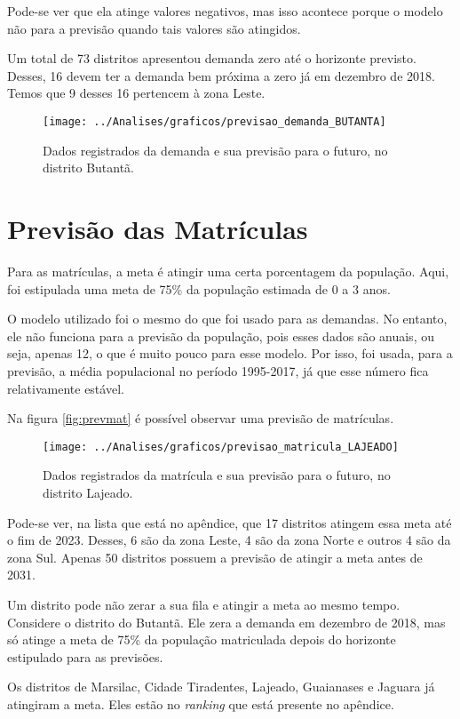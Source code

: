 Pode-se ver que ela atinge valores negativos, mas isso acontece porque o modelo não para a previsão quando tais valores são atingidos.

Um total de 73 distritos apresentou demanda zero até o horizonte previsto. Desses, 16 devem ter a demanda bem próxima a zero já em dezembro de 2018. Temos que 9 desses 16 pertencem à zona Leste.

\begin{figure}[H]
	\centering
	\texttt{[image: ../Analises/graficos/previsao\_demanda\_BUTANTA]}
	\caption{Dados registrados da demanda e sua previsão para o futuro, no distrito Butantã.}
	\label{fig:prevdem}
\end{figure}

\section{Previsão das Matrículas}

Para as matrículas, a meta é atingir uma certa porcentagem da população. Aqui, foi estipulada uma meta de 75\% da população estimada de 0 a 3 anos. 

O modelo utilizado foi o mesmo do que foi usado para as demandas. No entanto, ele não funciona para a previsão da população, pois esses dados são anuais, ou seja, apenas 12, o que é muito pouco para esse modelo. Por isso, foi usada, para a previsão, a média populacional no período 1995-2017, já que esse número fica relativamente estável.

Na figura \autoref{fig:prevmat} é possível observar uma previsão de matrículas.

\begin{figure}[H]
	\centering
	\texttt{[image: ../Analises/graficos/previsao\_matricula\_LAJEADO]}
	\caption{Dados registrados da matrícula e sua previsão para o futuro, no distrito Lajeado.}
	\label{fig:prevmat}
\end{figure}

Pode-se ver, na lista que está no apêndice, que 17 distritos atingem essa meta até o fim de 2023. Desses, 6 são da zona Leste, 4 são da zona Norte e outros 4 são da zona Sul. Apenas 50 distritos possuem a previsão de atingir a meta antes de 2031.

Um distrito pode não zerar a sua fila e atingir a meta ao mesmo tempo. Considere o distrito do Butantã. Ele zera a demanda em dezembro de 2018, mas só atinge a meta de 75\% da população matriculada depois do horizonte estipulado para as previsões.

Os distritos de Marsilac, Cidade Tiradentes, Lajeado, Guaianases e Jaguara já atingiram a meta. Eles estão no \textit{ranking} que está presente no apêndice.